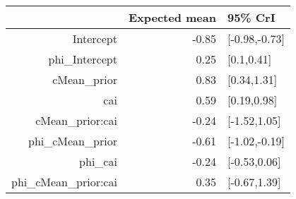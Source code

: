 \begin{tabular}{rrl}
  \hline
 & Expected mean & 95\% CrI \\ 
  \hline
Intercept & -0.85 & [-0.98,-0.73] \\ 
  phi\_Intercept & 0.25 & [0.1,0.41] \\ 
  cMean\_prior & 0.83 & [0.34,1.31] \\ 
  cai & 0.59 & [0.19,0.98] \\ 
  cMean\_prior:cai & -0.24 & [-1.52,1.05] \\ 
  phi\_cMean\_prior & -0.61 & [-1.02,-0.19] \\ 
  phi\_cai & -0.24 & [-0.53,0.06] \\ 
  phi\_cMean\_prior:cai & 0.35 & [-0.67,1.39] \\ 
   \hline
\end{tabular}

